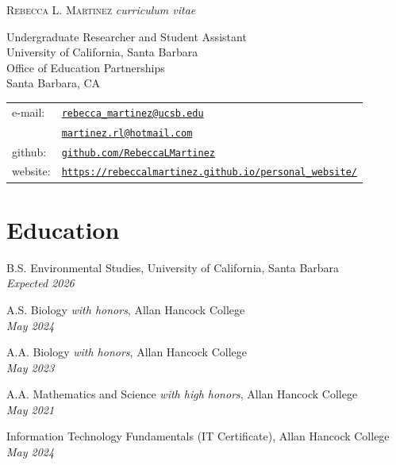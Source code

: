 \documentclass[letterpaper]{article}
\def\name{Rebecca L. Martinez}
\renewenvironment{itemize}{
  \begin{list}{}{
    \setlength{\leftmargin}{1.5em}
  }
}{
  \end{list}
}
\begin{document}
{\LARGE \scshape \name}
{\emph{curriculum vitae}}

\vspace{0.25in}

\begin{minipage}{0.55\linewidth}

Undergraduate Researcher and Student Assistant\\
University of California, Santa Barbara\\
Office of Education Partnerships\\
Santa Barbara, CA
\end{minipage}
\begin{minipage}{0.45\linewidth}
  \begin{tabular}{ll}
    e-mail: & \href{mailto:rebecca_martinez@ucsb.edu}{\tt rebecca\_martinez@ucsb.edu} \\
            & \href{mailto:martinez.rl@hotmail.com}{\tt martinez.rl@hotmail.com} \\
    github: & \href{https://github.com/RebeccaLMartinez}{\tt github.com/RebeccaLMartinez} \\
    website: & \href{https://rebeccalmartinez.github.io/personal_website/}{\tt https://rebeccalmartinez.github.io/personal_website/}
  \end{tabular}
\end{minipage}

\vspace{0.2in}

\section*{Education}

\begin{itemize}

  \item B.S. Environmental Studies, University of California, Santa Barbara \\
  \textit{Expected 2026}

  \item A.S. Biology \textit{with honors}, Allan Hancock College \\
  \textit{May 2024}

  \item A.A. Biology \textit{with honors}, Allan Hancock College \\
  \textit{May 2023}

  \item A.A. Mathematics and Science \textit{with high honors}, Allan Hancock College \\
  \textit{May 2021}

  \item Information Technology Fundamentals (IT Certificate), Allan Hancock College \\
  \textit{May 2024}

\end{itemize}
\end{document}
